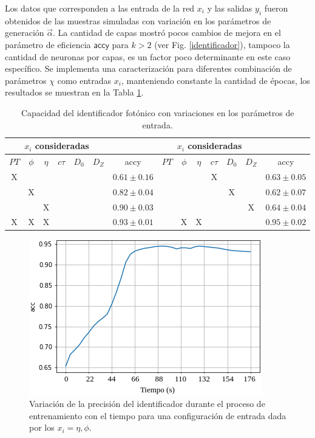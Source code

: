 Los datos que corresponden a las entrada de la red $x_i$ y las salidas $y_i$ fueron obtenidos de las muestras simuladas con variación en los parámetros de generación $\vec{\alpha}$. La cantidad de capas mostró pocos cambios de mejora en el parámetro de eficiencia $\textsf{accy} $ para $k>2$ (ver Fig. \ref{identificador}), tampoco la cantidad de neuronas por capas, es un factor poco determinante en este caso específico. Se implementa una caracterización para diferentes combinación de parámetros $\chi$ como entradas $x_i$, manteniendo constante la cantidad de épocas, los resultados se muestran en la Tabla 
\ref{ajuste1}.

\begin{table}[!h]
\footnotesize
\centering
\begin{tabular}{|cccccc|c||cccccc|c|}
\toprule
\multicolumn{6}{|c|}{$x_i$ consideradas} &  &
\multicolumn{6}{|c|}{$x_i$ consideradas} &  \\
\midrule
$PT$ & $\phi$ & $\eta$ & $c\tau$ & $D_0$ & $D_Z$  & \textsf{accy} &
$PT$ & $\phi$ & $\eta$ & $c\tau$ & $D_0$ & $D_Z$  & \textsf{accy} \\
\midrule
X &   &   &   &   &   & $0.61 \pm 0.16$ & 
  &   &   & X &   &   & $0.63 \pm 0.05$\\
  & X &   &   &   &   & $0.82 \pm 0.04$ & 
  &   &   &   & X &   & $0.62 \pm 0.07$\\  
  &   & X &   &   &   & $0.90 \pm 0.03$ & 
  &   &   &   &   & X & $0.64 \pm 0.04$\\
\bottomrule
X & X & X &  &  &  & $0.93 \pm 0.01$ &
 & X & X &  &  &  & $0.95 \pm 0.02$\\
\bottomrule 
\end{tabular}%
\caption{Capacidad del identificador fotónico con variaciones en los parámetros de entrada.}
\label{ajuste1}
\end{table}

\begin{figure}[!h]
\centering
\includegraphics[width=.5\textwidth]{Simulacion/imagenes/acc.png}
\caption{Variación de la precisión del identificador durante el proceso de entrenamiento con el tiempo para una configuración de entrada dada por los $x_i = \eta, \phi$.}
\label{identificador0}
\end{figure}

